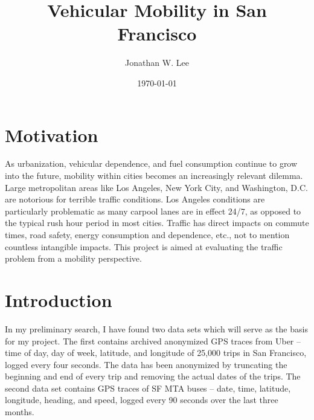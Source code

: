 \documentclass[12pt]{article}
\begin{document}

\title{
Vehicular Mobility in San Francisco
}

\author{Jonathan W. Lee}

\date{\today}

\maketitle

\section{Motivation}
As urbanization, vehicular dependence, and fuel consumption continue to grow into the future, mobility within cities becomes an increasingly relevant dilemma. Large metropolitan areas like Los Angeles, New York City, and Washington, D.C. are notorious for terrible traffic conditions. Los Angeles conditions are particularly problematic as many carpool lanes are in effect 24/7, as opposed to the typical rush hour period in most cities. Traffic has direct impacts on commute times, road safety, energy consumption and dependence, etc., not to mention countless intangible impacts. This project is aimed at evaluating the traffic problem from a mobility perspective.

\section{Introduction}

In my preliminary search, I have found two data sets which will serve as the basis for my project. The first contains archived anonymized GPS traces from Uber -- 
time of day, day of week, latitude, and longitude of 25,000 trips in San Francisco, logged every four seconds. The data has been anonymized by truncating the 
beginning and end of every trip and removing the actual dates of the trips. The second data set contains GPS traces of SF MTA buses -- date, time, latitude, 
longitude, heading, and speed, logged every 90 seconds over the last three months.
\end{document}
